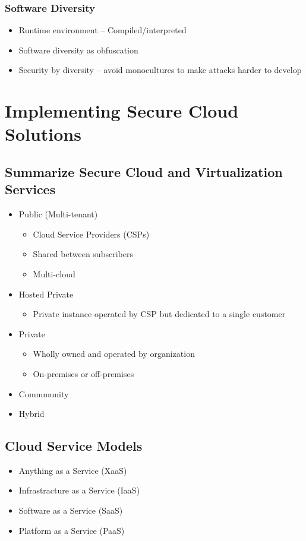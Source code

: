 		\subsubsection {Software Diversity}
			\begin{itemize}
				\item Runtime environment -- Compiled/interpreted
				\item Software diversity as obfuscation
				\item Security by diversity -- avoid monocultures to make
					attacks harder to develop
			\end{itemize}

\section {Implementing Secure Cloud Solutions}
	\subsection {Summarize Secure Cloud and Virtualization Services}
		\begin{itemize}
			\item Public (Multi-tenant)
				\begin{itemize}
					\item Cloud Service Providers (CSPs)
					\item Shared between subscribers
					\item Multi-cloud
				\end{itemize}
			\item Hosted Private
				\begin{itemize}
					\item Private instance operated by CSP but dedicated to a single
						customer
				\end{itemize}
			\item Private
				\begin{itemize}
					\item Wholly owned and operated by organization
					\item On-premises or off-premises
				\end{itemize}
			\item Commmunity
			\item Hybrid
		\end{itemize}
	\subsection {Cloud Service Models}
		\begin{itemize}
			\item Anything as a Service (XaaS)
			\item Infrastracture as a Service (IaaS)
			\item Software as a Service (SaaS)
			\item Platform as a Service (PaaS)
		\end{itemize}
